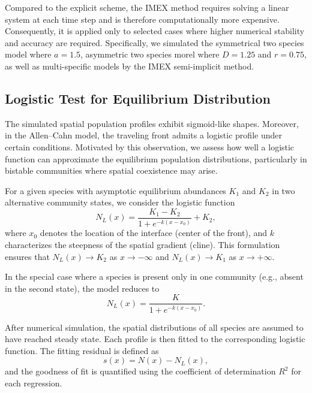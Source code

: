        Compared to the explicit scheme, the IMEX method requires solving a linear system at each time step and is therefore computationally more expensive. Consequently, it is applied only to selected cases where higher numerical stability and accuracy are required. Specifically, we simulated the symmetrical two species model where $a = 1.5$, asymmetric two species morel where $D = 1.25$ and $r=0.75$, as well as multi-specific models by the IMEX semi-implicit method.

\subsection{Logistic Test for Equilibrium Distribution}

    The simulated spatial population profiles exhibit sigmoid-like shapes. Moreover, in the Allen--Cahn model, the traveling front admits a logistic profile under certain conditions. Motivated by this observation, we assess how well a logistic function can approximate the equilibrium population distributions, particularly in bistable communities where spatial coexistence may arise.

    For a given species with asymptotic equilibrium abundances $K_1$ and $K_2$ in two alternative community states, we consider the logistic function
    \begin{equation}\label{eqn:logistic_full}
        N_L(x) = \frac{K_1 - K_2}{1 + e^{-k(x - x_0)}} + K_2,
    \end{equation}
    where $x_0$ denotes the location of the interface (center of the front), and $k$ characterizes the steepness of the spatial gradient (cline). This formulation ensures that $N_L(x) \to K_2$ as $x \to -\infty$ and $N_L(x) \to K_1$ as $x \to +\infty$.

    In the special case where a species is present only in one community (e.g., absent in the second state), the model reduces to
    \begin{equation*}
        N_L(x) = \frac{K}{1 + e^{-k(x - x_0)}}.
    \end{equation*}

    After numerical simulation, the spatial distributions of all species are assumed to have reached steady state. Each profile is then fitted to the corresponding logistic function. The fitting residual is defined as
    \begin{equation*}
        s(x) = N(x) - N_L(x),
    \end{equation*}
    and the goodness of fit is quantified using the coefficient of determination $R^2$ for each regression.


